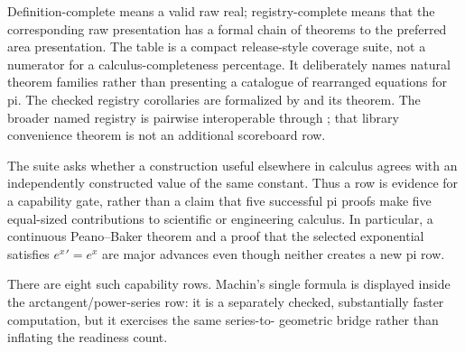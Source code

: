 Definition-complete means a valid raw real; registry-complete means that the
corresponding raw presentation has a formal chain of 
theorems to the preferred area presentation.  The table is a compact
release-style coverage suite, not a numerator for a calculus-completeness
percentage.  It deliberately names natural theorem families rather than
presenting a catalogue of rearranged equations for pi.  The checked registry
corollaries are formalized by  and its
 theorem.
The broader named registry is pairwise interoperable through
; that library convenience theorem is not
an additional scoreboard row.

The suite asks whether a construction useful elsewhere in calculus agrees
with an independently constructed value of the same constant.  Thus a row is
evidence for a capability gate, rather than a claim that five successful pi
proofs make five equal-sized contributions to scientific or engineering
calculus.  In particular, a continuous Peano--Baker theorem and a proof that
the selected exponential satisfies \(e^x{}'=e^x\) are major advances even
though neither creates a new pi row.

There are eight such capability rows.  Machin's single formula is displayed
inside the arctangent/power-series row: it is a separately checked,
substantially faster computation, but it exercises the same series-to-
geometric bridge rather than inflating the readiness count.

